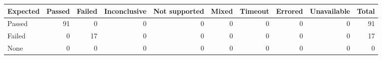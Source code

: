 \begin{tabular}{lrrrrrrrrr}
\toprule
Expected & Passed & Failed & Inconclusive & Not supported & Mixed & Timeout & Errored & Unavailable & Total \\
\midrule
Passed & 91 & 0 & 0 & 0 & 0 & 0 & 0 & 0 & 91 \\
Failed & 0 & 17 & 0 & 0 & 0 & 0 & 0 & 0 & 17 \\
None & 0 & 0 & 0 & 0 & 0 & 0 & 0 & 0 & 0 \\
\bottomrule
\end{tabular}
